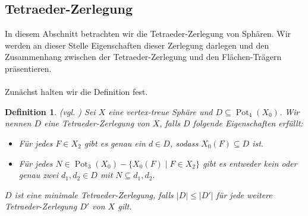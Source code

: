\documentclass[12pt,titlepage,twoside,cleardoublepage]{article}
\theoremstyle{nummermitklammern}
\newtheorem{definition}[temp]{Definition}
\newtheorem{definition}[zahl]{Definition}
\numberwithin{equation}{section}
\DeclareMathOperator{\Pot}{Pot}
\begin{document}
\subsection{Tetraeder-Zerlegung}
In diesem Abschnitt betrachten wir die Tetraeder-Zerlegung von Sphären. Wir werden an dieser Stelle Eigenschaften dieser Zerlegung darlegen und den Zusammenhang zwischen der Tetraeder-Zerlegung und den Flächen-Trägern präsentieren.\\
\\
Zunächst halten wir die Definition fest. 
\begin{definition}{\textsc{(}vgl. \textsc{\cite{simp})}}
Sei $X$ eine vertex-treue Sphäre und $D\subseteq \Pot_4(X_0)$. Wir nennen $D$ eine Tetraeder-Zerlegung von $X$, falls $D$ folgende Eigenschaften erfüllt:
\begin{itemize}
\item Für jedes $F\in X_2$ gibt es genau ein $d\in D$, sodass $X_0(F) \subseteq D$ ist.
\item Für jedes $N\in \Pot_3(X_0)-\{X_0(F)\mid F\in X_2\}$ gibt es entweder kein oder genau zwei $d_1,d_2\in D$ mit $N\subseteq d_1,d_2.$
\end{itemize}
$D$ ist eine minimale Tetraeder-Zerlegung, falls $\vert D \vert\leq \vert D' \vert$ für jede weitere Tetraeder-Zerlegung $D'$ von $X$ gilt.
\end{definition}
\end{document}
